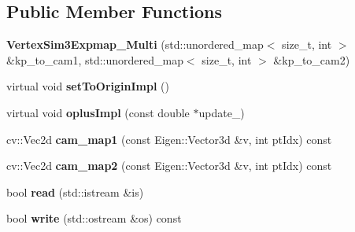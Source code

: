 \subsection*{Public Member Functions}
\begin{DoxyCompactItemize}
\item 
{\bfseries Vertex\+Sim3\+Expmap\+\_\+\+Multi} (std\+::unordered\+\_\+map$<$ size\+\_\+t, int $>$ \&kp\+\_\+to\+\_\+cam1, std\+::unordered\+\_\+map$<$ size\+\_\+t, int $>$ \&kp\+\_\+to\+\_\+cam2)\hypertarget{classMultiColSLAM_1_1VertexSim3Expmap__Multi_add103ed89904b987a14b9c5257a2002f}{}\label{classMultiColSLAM_1_1VertexSim3Expmap__Multi_add103ed89904b987a14b9c5257a2002f}

\item 
virtual void {\bfseries set\+To\+Origin\+Impl} ()\hypertarget{classMultiColSLAM_1_1VertexSim3Expmap__Multi_a20483aef66ae48d312190b3eebea3670}{}\label{classMultiColSLAM_1_1VertexSim3Expmap__Multi_a20483aef66ae48d312190b3eebea3670}

\item 
virtual void {\bfseries oplus\+Impl} (const double $\ast$update\+\_\+)\hypertarget{classMultiColSLAM_1_1VertexSim3Expmap__Multi_aefd1904bc6ee3641e77c179fb4ca95cc}{}\label{classMultiColSLAM_1_1VertexSim3Expmap__Multi_aefd1904bc6ee3641e77c179fb4ca95cc}

\item 
cv\+::\+Vec2d {\bfseries cam\+\_\+map1} (const Eigen\+::\+Vector3d \&v, int pt\+Idx) const \hypertarget{classMultiColSLAM_1_1VertexSim3Expmap__Multi_a7841d1f192b0930af6a988c909dc5d40}{}\label{classMultiColSLAM_1_1VertexSim3Expmap__Multi_a7841d1f192b0930af6a988c909dc5d40}

\item 
cv\+::\+Vec2d {\bfseries cam\+\_\+map2} (const Eigen\+::\+Vector3d \&v, int pt\+Idx) const \hypertarget{classMultiColSLAM_1_1VertexSim3Expmap__Multi_acf01b0f19b5e72e0eb9fd8e0f8b24431}{}\label{classMultiColSLAM_1_1VertexSim3Expmap__Multi_acf01b0f19b5e72e0eb9fd8e0f8b24431}

\item 
bool {\bfseries read} (std\+::istream \&is)\hypertarget{classMultiColSLAM_1_1VertexSim3Expmap__Multi_a45ce305be328622b172e302f6d758988}{}\label{classMultiColSLAM_1_1VertexSim3Expmap__Multi_a45ce305be328622b172e302f6d758988}

\item 
bool {\bfseries write} (std\+::ostream \&os) const \hypertarget{classMultiColSLAM_1_1VertexSim3Expmap__Multi_a3ecf0aa5d0f7465e96f7b6cfd51ad6d8}{}\label{classMultiColSLAM_1_1VertexSim3Expmap__Multi_a3ecf0aa5d0f7465e96f7b6cfd51ad6d8}

\end{DoxyCompactItemize}

